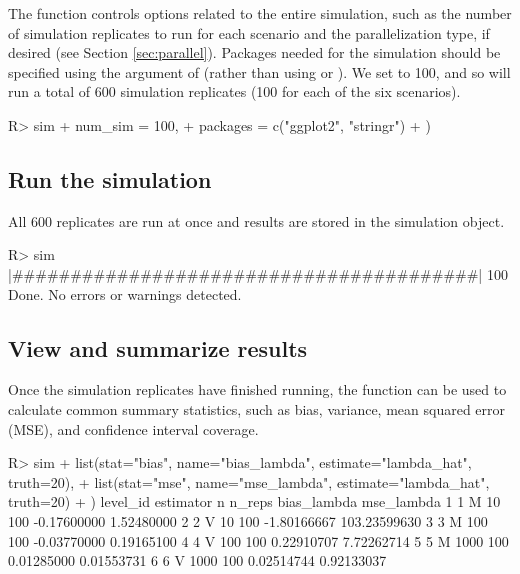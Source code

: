 The  function controls options related to the entire simulation, such as the number of simulation replicates to run for each scenario and the parallelization type, if desired (see Section \ref{sec:parallel}). Packages needed for the simulation should be specified using the  argument of  (rather than using  or ). We set  to 100, and so  will run a total of 600 simulation replicates (100 for each of the six scenarios).

\begin{example}
R> sim %
+    num_sim = 100,
+    packages = c("ggplot2", "stringr")
+  )
\end{example}

\subsection{Run the simulation}

All 600 replicates are run at once and results are stored in the simulation object.

\begin{example}
R> sim %
  |########################################| 100%
Done. No errors or warnings detected.
\end{example}

\subsection{View and summarize results}

Once the simulation replicates have finished running, the  function can be used to calculate common summary statistics, such as bias, variance, mean squared error (MSE), and confidence interval coverage.

\begin{example}
R> sim %
+    list(stat="bias", name="bias_lambda", estimate="lambda_hat", truth=20),
+    list(stat="mse", name="mse_lambda", estimate="lambda_hat", truth=20)
+  )
  level_id estimator    n n_reps bias_lambda   mse_lambda
1        1         M   10    100 -0.17600000   1.52480000
2        2         V   10    100 -1.80166667 103.23599630
3        3         M  100    100 -0.03770000   0.19165100
4        4         V  100    100  0.22910707   7.72262714
5        5         M 1000    100  0.01285000   0.01553731
6        6         V 1000    100  0.02514744   0.92133037
\end{example}


